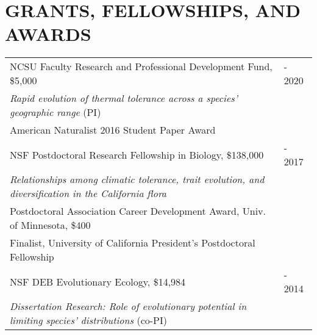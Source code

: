 \documentclass[11pt,english]{article}\usepackage[]{graphicx}\usepackage[]{color}
\providecommand{\tabularnewline}{\\}
\begin{document}
\vspace{2ex}
\section*{GRANTS, FELLOWSHIPS, AND AWARDS}
\vspace{-0.5ex}

\renewcommand{\arraystretch}{1.2}
\begin{tabularx}{\textwidth}{@{}>{\raggedright}p{5.25in} >{\raggedleft}X@{}}
NCSU Faculty Research and Professional Development Fund, \$5,000 & 2019 - 2020 \tabularnewline
\addtolength{\leftskip}{5ex}\emph{Rapid evolution of thermal tolerance across a species' geographic range} (PI)  & \tabularnewline

American Naturalist 2016 Student Paper Award & 2017 \tabularnewline

NSF Postdoctoral Research Fellowship in Biology, \$138,000 & 2016 - 2017 \tabularnewline
\addtolength{\leftskip}{5ex}\emph{Relationships among climatic tolerance, trait evolution, and diversification in the California flora} \tabularnewline

Postdoctoral Association Career Development Award, Univ. of Minnesota, \$400 & 2015 \tabularnewline 

Finalist, University of California President's Postdoctoral Fellowship & 2014
\tabularnewline

NSF DEB Evolutionary Ecology, \$14,984 & 2012 - 2014 \tabularnewline
\addtolength{\leftskip}{5ex}\emph{Dissertation Research: Role of evolutionary potential in limiting species' distributions} (co-PI)
\vspace{0.5ex} \tabularnewline

\end{tabularx}
\end{document}
